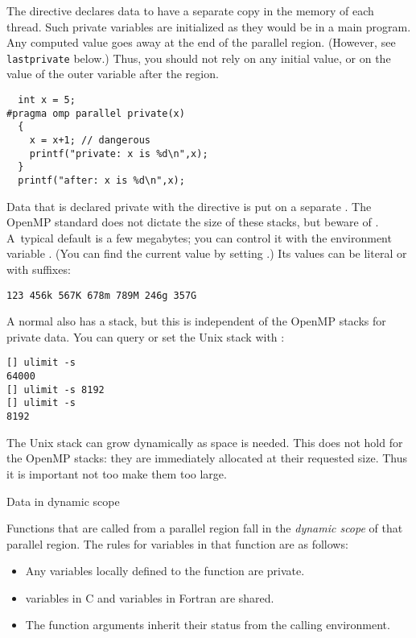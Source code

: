 The  directive declares data to have a separate copy 
in the memory of each thread. 
Such private variables are initialized as they would be in a main program.
Any computed value goes away at the end 
of the parallel region.
(However, see \lstinline{lastprivate} below.)
Thus, you should not rely on any initial value, or on the value of the outer variable
after the region.

\begin{lstlisting}
  int x = 5;
#pragma omp parallel private(x)
  {
    x = x+1; // dangerous
    printf("private: x is %d\n",x);
  }
  printf("after: x is %d\n",x);
\end{lstlisting}

Data that is declared private with the  directive is
put on a separate .
The OpenMP standard
does not dictate the size of these stacks,
but beware of .
A~typical default is a few megabytes;
you can control it with the environment variable
.
(You can find the current value by setting .)
Its values can be literal or with suffixes:
\begin{verbatim}
123 456k 567K 678m 789M 246g 357G
\end{verbatim}

A normal  also has a stack, but this is
independent of the OpenMP stacks for private data. You can query or
set the Unix stack with :
\begin{verbatim}
[] ulimit -s
64000
[] ulimit -s 8192
[] ulimit -s
8192
\end{verbatim}
The Unix stack can grow dynamically as space is needed. This does not
hold for the OpenMP stacks: they are immediately allocated at their
requested size. Thus it is important not too make them too large.

 {Data in dynamic scope}

Functions that are called from a parallel region fall in the
\emph{dynamic scope} of that
parallel region. The rules for variables in that function are as follows:
\begin{itemize}
\item Any variables locally defined to the function are private.
\item {} variables in C and  variables in Fortran
  are shared.
\item The function arguments inherit their status from the calling environment.
\end{itemize}

